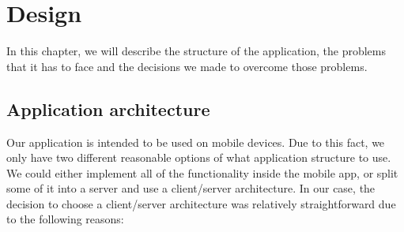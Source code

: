\chapter{Design}

In this chapter, we will describe the structure of the application, the problems that it has to face and the decisions we made to overcome those problems.

\section{Application architecture}

Our application is intended to be used on mobile devices. Due to this fact, we only have two different reasonable options of what application structure to use. We could either implement all of the functionality inside the mobile app, or split some of it into a server and use a client/server architecture. In our case, the decision to choose a client/server architecture was relatively straightforward due to the following reasons:

